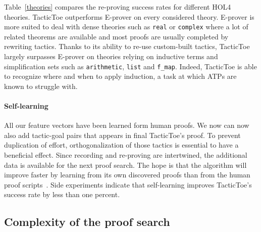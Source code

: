 \documentclass[runningheads,a4paper,draft]{svjour3}
\def\holfour{\textsf{HOL4}\xspace}
\def\eprover{\textsf{E-prover}\xspace}
\def\tactictoe{\textsf{TacticToe}\xspace}
\begin{document}
Table~\ref{theories} compares the re-proving success rates for different
\holfour theories. \tactictoe outperforms \eprover on every
considered theory.
\eprover is more suited to deal with dense theories such as
\texttt{real} or \texttt{complex} where a lot of related theorems are available
and most proofs are usually completed by rewriting tactics. Thanks to its
ability to re-use custom-built tactics, \tactictoe
largely surpasses \eprover on theories relying on inductive terms and
simplification sets such as \texttt{arithmetic}, \texttt{list}
and \texttt{f\_map}. Indeed, \tactictoe is able to recognize where and when to
apply induction, a task at which ATPs are known to struggle with.


\paragraph{Self-learning}
All our feature vectors have been learned form human proofs. We now can now
also add tactic-goal pairs that appears in final \tactictoe's proof. To prevent
duplication of effort, orthogonalization of those
tactics is essential to have a beneficial effect.
Since recording and re-proving are intertwined, the additional data is
available for the next proof search.
The hope is that the algorithm will improve faster by learning from its own
discovered proofs than from the human proof
scripts~\cite{DBLP:conf/cade/Urban07}. Side experiments indicate that
self-learning improves \tactictoe's success rate by less than one percent.



\subsection{Complexity of the proof search}
\end{document}
